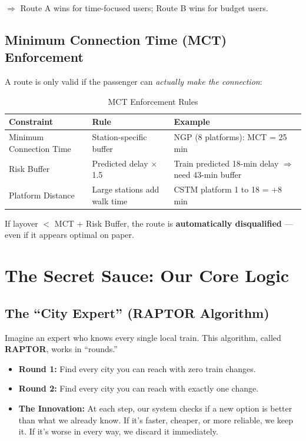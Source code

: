 \documentclass[12pt,a4paper]{report}
\begin{document}
$\Rightarrow$ Route A wins for time-focused users; Route B wins for budget users.

\subsection*{Minimum Connection Time (MCT) Enforcement}

A route is only valid if the passenger can \textit{actually make the connection}:

\begin{table}[h!]
\centering
\caption{MCT Enforcement Rules}
\begin{tabularx}{\textwidth}{lXX}
\toprule
\textbf{Constraint} & \textbf{Rule} & \textbf{Example} \\
\midrule
Minimum Connection Time & Station-specific buffer & NGP (8 platforms): MCT = 25 min \\
Risk Buffer & Predicted delay $\times$ 1.5 & Train predicted 18-min delay $\Rightarrow$ need 43-min buffer \\
Platform Distance & Large stations add walk time & CSTM platform 1 to 18 = +8 min \\
\bottomrule
\end{tabularx}
\end{table}

If layover $<$ MCT + Risk Buffer, the route is \textbf{automatically disqualified} --- even if it appears optimal on paper.

\section{The Secret Sauce: Our Core Logic}

\subsection{The ``City Expert'' (RAPTOR Algorithm)}

Imagine an expert who knows every single local train. This algorithm, called \textbf{RAPTOR}, works in ``rounds.''

\begin{itemize}[leftmargin=1.5em]
  \item \textbf{Round 1:} Find every city you can reach with zero train changes.
  \item \textbf{Round 2:} Find every city you can reach with exactly one change.
  \item \textbf{The Innovation:} At each step, our system checks if a new option is better than what we already know. If it's faster, cheaper, or more reliable, we keep it. If it's worse in every way, we discard it immediately.
\end{itemize}
\end{document}
